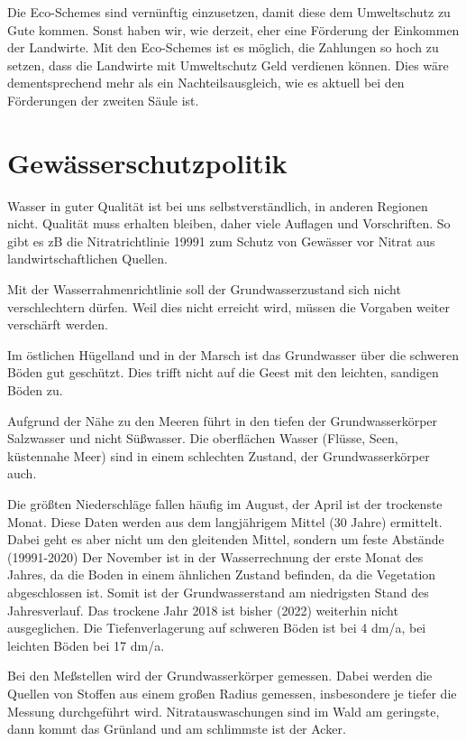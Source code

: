 \documentclass[11pt]{scrbook}
\begin{document}
Die Eco-Schemes sind vernünftig einzusetzen, damit diese dem Umweltschutz zu Gute kommen.
Sonst haben wir, wie derzeit, eher eine Förderung der Einkommen der Landwirte.
Mit den Eco-Schemes ist es möglich, die Zahlungen so hoch zu setzen, dass die Landwirte mit Umweltschutz Geld verdienen können.
Dies wäre dementsprechend mehr als ein Nachteilsausgleich, wie es aktuell bei den Förderungen der zweiten Säule ist.




\section{Gewässerschutzpolitik}

Wasser in guter Qualität ist bei uns selbstverständlich, in anderen Regionen nicht.
Qualität muss erhalten bleiben, daher viele Auflagen und Vorschriften.
So gibt es zB die Nitratrichtlinie 19991 zum Schutz von Gewässer vor Nitrat aus landwirtschaftlichen Quellen.

Mit der Wasserrahmenrichtlinie soll der Grundwasserzustand sich nicht verschlechtern dürfen.
Weil dies nicht erreicht wird, müssen die Vorgaben weiter verschärft werden.

Im östlichen Hügelland und in der Marsch ist das Grundwasser über die schweren Böden gut geschützt.
Dies trifft nicht auf die Geest mit den leichten, sandigen Böden zu.

Aufgrund der Nähe zu den Meeren führt in den tiefen der Grundwasserkörper Salzwasser und nicht Süßwasser.
Die oberflächen Wasser (Flüsse, Seen, küstennahe Meer) sind in einem schlechten Zustand, der Grundwasserkörper auch.

Die größten Niederschläge fallen häufig im August, der April ist der trockenste Monat.
Diese Daten werden aus dem langjährigem Mittel (30 Jahre) ermittelt.
Dabei geht es aber nicht um den gleitenden Mittel, sondern um feste Abstände (19991-2020)
Der November ist in der Wasserrechnung der erste Monat des Jahres, da die Boden in einem ähnlichen Zustand befinden, da die Vegetation abgeschlossen ist.
Somit ist der Grundwasserstand am niedrigsten Stand des Jahresverlauf.
Das trockene Jahr 2018 ist bisher (2022) weiterhin nicht ausgeglichen.
Die Tiefenverlagerung auf schweren Böden ist bei 4 dm/a, bei leichten Böden bei 17 dm/a.

Bei den Meßstellen wird der Grundwasserkörper gemessen.
Dabei werden die Quellen von Stoffen aus einem großen Radius gemessen, insbesondere je tiefer die Messung durchgeführt wird.
Nitratauswaschungen sind im Wald am geringste, dann kommt das Grünland und am \glqq schlimmste\grqq{} ist der Acker.
\end{document}
